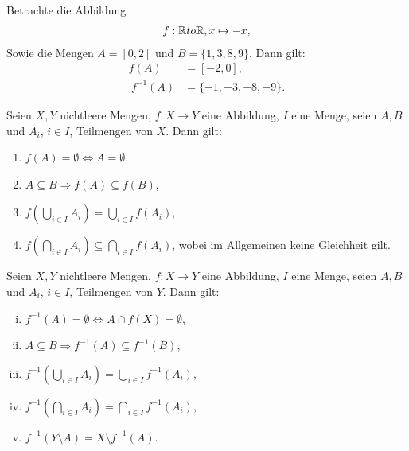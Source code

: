 \begin{example}
    Betrachte die Abbildung 
    \begin{align*}
        f: \mathbb{R} to \mathbb{R}, x \mapsto -x,
    \end{align*}
    Sowie die Mengen $A = [0,2]$ und $B = \{1,3,8,9\}$. Dann gilt: 
    \begin{align*}
        f(A) &= [-2,0], \\\
        f^{-1}(A) &= \{-1, -3,-8,-9\}. 
    \end{align*}
\end{example}

\begin{theorem}
    Seien $X,Y$ nichtleere Mengen, $f:X \to Y$ eine Abbildung, $I$ eine Menge, seien $A,B$ und $A_i$, $i \in I$, Teilmengen von $X$. Dann gilt: 
    \begin{enumerate}
        \item
        $f(A) = \emptyset \iff A = \emptyset$, 
        \item 
        $A \subseteq B \Rightarrow f(A) \subseteq f(B)$,
        \item 
        $ f(\bigcup_{i \in I}A_i) = \bigcup_{i \in I}f(A_i)$,
        \item 
        $ f(\bigcap_{i \in I}A_i) \subseteq \bigcap_{i \in I}f(A_i)$, wobei im Allgemeinen keine Gleichheit gilt. 
    \end{enumerate}
\end{theorem}

\begin{proof*}
\end{proof*}

\begin{theorem}
    Seien $X,Y$ nichtleere Mengen, $f:X \to Y$ eine Abbildung, $I$ eine Menge, seien $A,B$ und $A_i$, $i \in I$, Teilmengen von $Y$. Dann gilt: 
    \begin{enumerate}[(i)]
        \item 
        $f^{-1}(A) = \emptyset \iff A \cap f(X) = \emptyset$,
        \item 
        $A \subseteq B \Rightarrow f^{-1}(A) \subseteq f^{-1}(B)$,
        \item 
        $f^{-1}(\bigcup_{i \in I}A_i) = \bigcup_{i \in I}f^{-1}(A_i)$,
        \item 
        $f^{-1}(\bigcap_{i \in I}A_i) = \bigcap_{i \in I}f^{-1}(A_i)$,
        \item 
        $f^{-1}(Y \setminus A) = X \setminus f^{-1}(A)$.
    \end{enumerate}
\end{theorem}

\begin{proof*}
\end{proof*}

